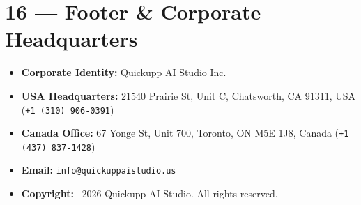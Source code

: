 \documentclass[11pt,a4paper]{article}
\begin{document}
\section{16 --- Footer & Corporate Headquarters}
\begin{itemize}[noitemsep]
    \item \textbf{Corporate Identity:} Quickupp AI Studio Inc.
    \item \textbf{USA Headquarters:} 21540 Prairie St, Unit C, Chatsworth, CA 91311, USA (\texttt{+1 (310) 906-0391})
    \item \textbf{Canada Office:} 67 Yonge St, Unit 700, Toronto, ON M5E 1J8, Canada (\texttt{+1 (437) 837-1428})
    \item \textbf{Email:} \texttt{info@quickuppaistudio.us}
    \item \textbf{Copyright:} \textcopyright\ 2026 Quickupp AI Studio. All rights reserved.
\end{itemize}
\end{document}
